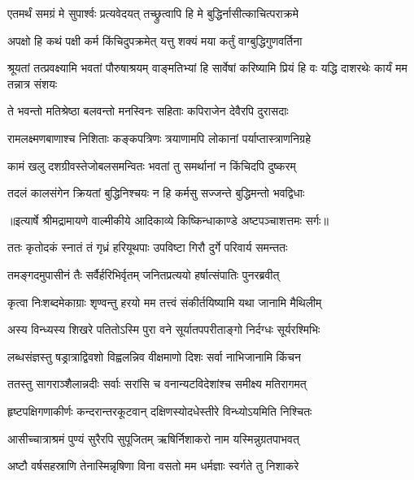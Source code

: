 \twolineshloka
{एतमर्थं समग्रं मे सुपार्श्वः प्रत्यवेदयत्}
{तच्छ्रुत्वापि हि मे बुद्धिर्नासीत्काचित्पराक्रमे} %

\twolineshloka
{अपक्षो हि कथं पक्षी कर्म किंचिदुपक्रमेत्}
{यत्तु शक्यं मया कर्तुं वाग्बुद्धिगुणवर्तिना} %

\threelineshloka
{श्रूयतां तत्प्रवक्ष्यामि भवतां पौरुषाश्रयम्}
{वाङ्मतिभ्यां हि सार्वेषां करिष्यामि प्रियं हि वः}
{यद्धि दाशरथेः कार्यं मम तन्नात्र संशयः} %

\twolineshloka
{ते भवन्तो मतिश्रेष्ठा बलवन्तो मनस्विनः}
{सहिताः कपिराजेन देवैरपि दुरासदाः} %

\twolineshloka
{रामलक्ष्मणबाणाश्च निशिताः कङ्कपत्रिणः}
{त्रयाणामपि लोकानां पर्याप्तास्त्राणनिग्रहे} %

\twolineshloka
{कामं खलु दशग्रीवस्तेजोबलसमन्वितः}
{भवतां तु समर्थानां न किंचिदपि दुष्करम्} %

\twolineshloka
{तदलं कालसंगेन क्रियतां बुद्धिनिश्चयः}
{न हि कर्मसु सज्जन्ते बुद्धिमन्तो भवद्विधाः} %


{॥इत्यार्षे श्रीमद्रामायणे वाल्मीकीये आदिकाव्ये किष्किन्धाकाण्डे अष्टपञ्चाशत्तमः सर्गः॥}


\twolineshloka
{ततः कृतोदकं स्नातं तं गृध्रं हरियूथपाः}
{उपविष्टा गिरौ दुर्गे परिवार्य समन्ततः} %

\twolineshloka
{तमङ्गदमुपासीनं तैः सर्वैर्हरिभिर्वृतम्}
{जनितप्रत्ययो हर्षात्संपातिः पुनरब्रवीत्} %

\twolineshloka
{कृत्वा निःशब्दमेकाग्राः शृण्वन्तु हरयो मम}
{तत्त्वं संकीर्तयिष्यामि यथा जानामि मैथिलीम्} %

\twolineshloka
{अस्य विन्ध्यस्य शिखरे पतितोऽस्मि पुरा वने}
{सूर्यातपपरीताङ्गो निर्दग्धः सूर्यरश्मिभिः} %

\twolineshloka
{लब्धसंज्ञस्तु षड्रात्राद्विवशो विह्वलन्निव}
{वीक्षमाणो दिशः सर्वा नाभिजानामि किंचन} %

\twolineshloka
{ततस्तु सागराञ्शैलान्नदीः सर्वाः सरांसि च}
{वनान्यटविदेशांश्च समीक्ष्य मतिरागमत्} %

\twolineshloka
{हृष्टपक्षिगणाकीर्णः कन्दरान्तरकूटवान्}
{दक्षिणस्योदधेस्तीरे विन्ध्योऽयमिति निश्चितः} %

\twolineshloka
{आसीच्चात्राश्रमं पुण्यं सुरैरपि सुपूजितम्}
{ऋषिर्निशाकरो नाम यस्मिन्नुग्रतपाभवत्} %

\twolineshloka
{अष्टौ वर्षसहस्राणि तेनास्मिन्नृषिणा विना}
{वसतो मम धर्मज्ञाः स्वर्गते तु निशाकरे} %

